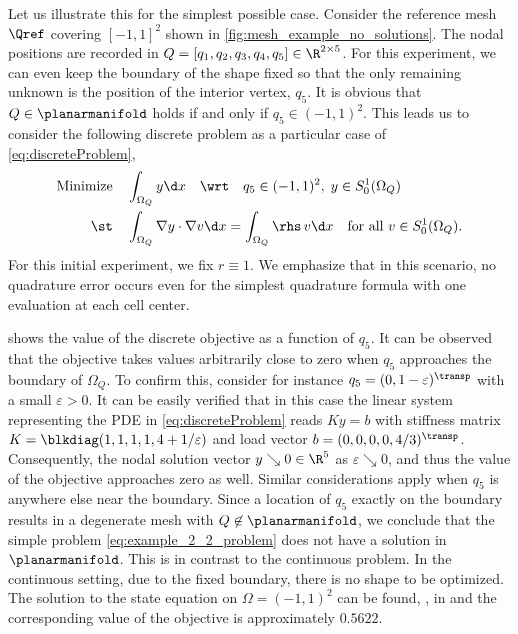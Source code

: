 Let us illustrate this for the simplest possible case.
Consider the reference mesh $\Qref$ covering $[-1,1]^2$ shown in \cref{fig:mesh_example_no_solutions}.
The nodal positions are recorded in $Q = [q_1, q_2, q_3, q_4, q_5] \in \R^{2\times 5}$.
For this experiment, we can even keep the boundary of the shape fixed so that the only remaining unknown is the position of the interior vertex, $q_5$.
It is obvious that $Q \in \planarmanifold$ holds if and only if $q_5 \in (-1,1)^2$.
This leads us to consider the following discrete problem as a particular case of \eqref{eq:discreteProblem},
\begin{equation}
	\label{eq:example_2_2_problem}
	\begin{aligned}
		\text{Minimize}
		&
		\quad
		\int_{\Omega_Q} y \d x
		\quad
		\text{\wrt}
		\quad
		q_5 \in(-1,1)^2
		,
		\;
		y \in S^1_0(\Omega_Q)
		\\
		\text{\st}
		&
		\quad
		\int_{\Omega_Q} \nabla y \cdot \nabla v \d x
		=
		\int_{\Omega_Q} \rhs \, v \d x
		\quad
		\text{for all }
		v \in S^1_0(\Omega_Q)
		.
	\end{aligned}
\end{equation}
For this initial experiment, we fix $r \equiv 1$.
We emphasize that in this scenario, no quadrature error occurs even for the simplest quadrature formula with one evaluation at each cell center.

 shows the value of the discrete objective as a function of $q_5$.
It can be observed that the objective takes values arbitrarily close to zero when $q_5$ approaches the boundary of $\Omega_Q$.
To confirm this, consider for instance $q_5 = (0,1-\varepsilon)^\transp$ with a small $\varepsilon > 0$.
It can be easily verified that in this case the linear system representing the PDE in \eqref{eq:discreteProblem} reads $K y = b$ with stiffness matrix $K = \blkdiag(1,1,1,1,4+1/\varepsilon)$ and load vector $b = (0,0,0,0,4/3)^\transp$.
Consequently, the nodal solution vector $y \searrow 0 \in \R^5$ as $\varepsilon \searrow 0$, and thus the value of the objective approaches zero as well.
Similar considerations apply when $q_5$ is anywhere else near the boundary.
Since a location of $q_5$ exactly on the boundary results in a degenerate mesh with $Q \not \in \planarmanifold$, we conclude that the simple problem \eqref{eq:example_2_2_problem} does not have a solution in $\planarmanifold$.
This is in contrast to the continuous problem.
In the continuous setting, due to the fixed boundary, there is no shape to be optimized.
The solution to the state equation on $\Omega = (-1,1)^2$ can be found, \eg, in \cite[Example~1.1.1, p.10]{ElmanSilvesterWathen:2014:1} and the corresponding value of the objective is approximately $0.5622$.

